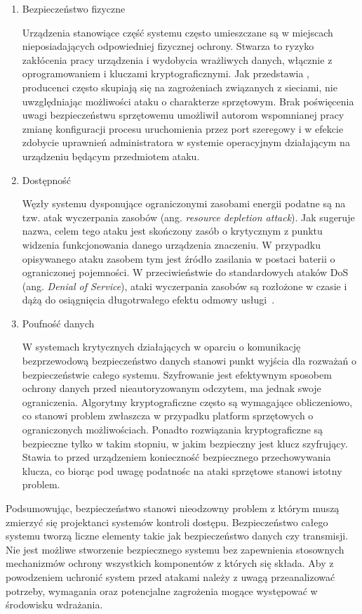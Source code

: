 		\begin{enumerate}[label=\Alph*.]
			\item Bezpieczeństwo fizyczne

				Urządzenia stanowiące część systemu często umieszczane są w miejscach nieposiadających odpowiedniej fizycznej ochrony. Stwarza to ryzyko zakłócenia pracy urządzenia i wydobycia wrażliwych danych, włącznie z oprogramowaniem i kluczami kryptograficznymi. Jak przedstawia \cite{iot-hardware-attack}, producenci często skupiają się na zagrożeniach związanych z sieciami, nie uwzględniając możliwości ataku o charakterze sprzętowym. Brak poświęcenia uwagi bezpieczeństwu sprzętowemu umożliwił autorom wspomnianej pracy zmianę konfiguracji procesu uruchomienia przez port szeregowy i w efekcie zdobycie uprawnień administratora w systemie operacyjnym działającym na urządzeniu będącym przedmiotem ataku.

			\item Dostępność

				Węzły systemu dysponujące ograniczonymi zasobami energii podatne są na tzw. atak wyczerpania zasobów (ang. \textit{resource depletion attack}). Jak sugeruje nazwa, celem tego ataku jest skończony zasób o krytycznym z punktu widzenia funkcjonowania danego urządzenia znaczeniu. W przypadku opisywanego ataku zasobem tym jest źródło zasilania w postaci baterii o ograniczonej pojemności. W przeciwieństwie do standardowych ataków DoS (ang. \textit{Denial of Service}), ataki wyczerpania zasobów są rozłożone w czasie i dążą do osiągnięcia długotrwałego efektu odmowy usługi~\cite{iot-rd-attack}.

			\item Poufność danych

				W systemach krytycznych działających w oparciu o komunikację bezprzewodową bezpieczeństwo danych stanowi punkt wyjścia dla rozważań o bezpieczeństwie całego systemu. Szyfrowanie jest efektywnym sposobem ochrony danych przed nieautoryzowanym odczytem, ma jednak swoje ograniczenia. Algorytmy kryptograficzne często są wymagające obliczeniowo, co stanowi problem zwłaszcza w przypadku platform sprzętowych o ograniczonych możliwościach. Ponadto rozwiązania kryptograficzne są bezpieczne tylko w takim stopniu, w jakim bezpieczny jest klucz szyfrujący. Stawia to przed urządzeniem konieczność bezpiecznego przechowywania klucza, co biorąc pod uwagę podatnośc na ataki sprzętowe stanowi istotny problem.

		\end{enumerate}

		Podsumowując, bezpieczeństwo stanowi nieodzowny problem z którym muszą zmierzyć się projektanci systemów kontroli dostępu. Bezpieczeństwo całego systemu tworzą liczne elementy takie jak bezpieczeństwo danych czy transmisji. Nie jest możliwe stworzenie bezpiecznego systemu bez zapewnienia stosownych mechanizmów ochrony wszystkich komponentów z których się składa. Aby z powodzeniem uchronić system przed atakami należy z uwagą przeanalizować potrzeby, wymagania oraz potencjalne zagrożenia mogące występować w środowisku wdrażania. 